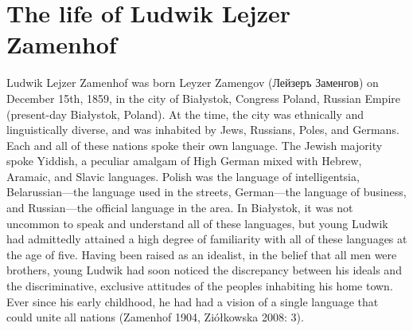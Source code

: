 \section{The life of Ludwik Lejzer Zamenhof}
Ludwik Lejzer Zamenhof was born Leyzer Zamengov (Лейзеръ Заменгов\noteonrussian{}) on December 15th, 1859, in the city of Białystok, Congress Poland, Russian Empire (present-day Białystok, Poland).
At the time, the city was ethnically and linguistically diverse, and was inhabited by Jews, Russians, Poles, and Germans.
Each and all of these nations spoke their own language.
The Jewish majority spoke Yiddish, a peculiar amalgam of High German mixed with Hebrew, Aramaic, and Slavic languages.
Polish was the language of intelligentsia, Belarussian---the language used in the streets, German---the language of business, and Russian---the official language in the area.
In Białystok, it was not uncommon to speak and understand all of these languages, but young Ludwik had admittedly attained a high degree of familiarity with all of these languages at the age of five.
Having been raised as an idealist, in the belief that all men were brothers, young Ludwik had soon noticed the discrepancy between his ideals and the discriminative, exclusive attitudes of the peoples inhabiting his home town.
Ever since his early childhood, he had had a vision of a single language that could unite all nations
(Zamenhof 1904, Ziółkowska 2008: 3).

